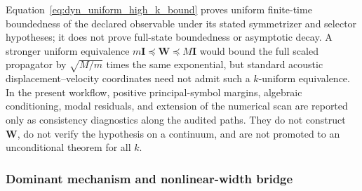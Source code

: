 Equation~\eqref{eq:dyn_uniform_high_k_bound} proves uniform finite-time
boundedness of the declared observable under its stated symmetrizer and
selector hypotheses; it does not prove full-state boundedness or asymptotic
decay.  A stronger uniform equivalence
$m\boldsymbol I\preceq\boldsymbol W\preceq M\boldsymbol I$ would bound the
full scaled propagator by $\sqrt{M/m}$ times the same exponential, but standard
acoustic displacement--velocity coordinates need not admit such a $k$-uniform
equivalence.  In the present workflow, positive principal-symbol margins,
algebraic conditioning, modal residuals, and extension of the numerical scan
are reported only as consistency diagnostics along the audited paths.  They do
not construct $\boldsymbol W$, do not verify the hypothesis on a continuum,
and are not promoted to an unconditional theorem for all $k$.

\subsubsection{Dominant mechanism and nonlinear-width bridge}

